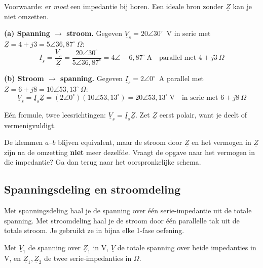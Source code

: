 \documentclass[a4paper,11pt]{article}
\begin{document}
Voorwaarde: er \emph{moet} een impedantie bij horen. Een ideale bron zonder $\underline{Z}$ kan je
niet omzetten.

\begin{voorbeeld}
    \textbf{(a) Spanning $\rightarrow$ stroom.} Gegeven $\underline{V}_s = 20\angle 30^\circ$~V in
    serie met $\underline{Z} = 4 + j3 = 5\angle 36{,}87^\circ\ \Omega$:
    \[\underline{I}_s = \frac{\underline{V}_s}{\underline{Z}}
        = \frac{20\angle 30^\circ}{5\angle 36{,}87^\circ}
        = \boxed{4\angle -6{,}87^\circ\ \text{A}} \quad\text{parallel met } 4+j3\ \Omega\]

    \textbf{(b) Stroom $\rightarrow$ spanning.} Gegeven $\underline{I}_s = 2\angle 0^\circ$~A
    parallel met $\underline{Z} = 6 + j8 = 10\angle 53{,}13^\circ\ \Omega$:
    \[\underline{V}_s = \underline{I}_s\underline{Z}
        = (2\angle 0^\circ)(10\angle 53{,}13^\circ)
        = \boxed{20\angle 53{,}13^\circ\ \text{V}} \quad\text{in serie met } 6+j8\ \Omega\]

    Eén formule, twee leesrichtingen: $\underline{V}_s = \underline{I}_s\underline{Z}$. Zet
    $\underline{Z}$ eerst polair, want je deelt of vermenigvuldigt.
\end{voorbeeld}

\begin{waarschuwing}
    De klemmen $a$--$b$ blijven equivalent, maar de stroom door $\underline{Z}$ en het vermogen in
    $\underline{Z}$ zijn na de omzetting \textbf{niet} meer dezelfde. Vraagt de opgave naar het
    vermogen in die impedantie? Ga dan terug naar het oorspronkelijke schema.
\end{waarschuwing}



\subsection{Spanningsdeling en stroomdeling}

Met spanningsdeling haal je de spanning over \'e\'en serie-impedantie uit de totale spanning. Met
stroomdeling haal je de stroom door \'e\'en parallelle tak uit de totale stroom. Je gebruikt ze in
bijna elke 1-fase oefening.

{Met $\underline{V}_1$ de spanning over $\underline{Z}_1$ in V, $\underline{V}$ de totale spanning
    over beide impedanties in V, en $\underline{Z}_1,\underline{Z}_2$ de twee serie-impedanties in $\Omega$.}
\end{document}

